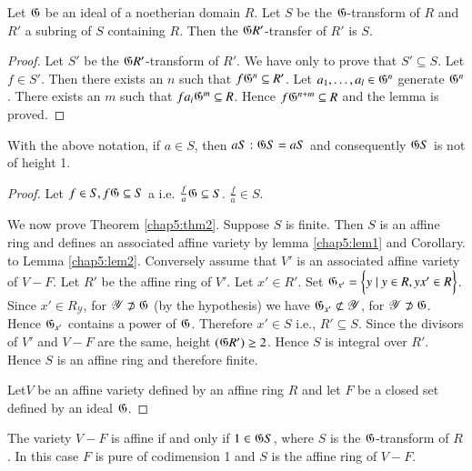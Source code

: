 \begin{lem}\label{chap5:lem2}%
  Let $\mathfrak{G}$ be an ideal of a noetherian domain $R$. Let $S$
  be the $\mathfrak{G}$-transform of $R$ and $R'$ a subring of $S$
  containing $R$. Then the $\mathfrak{G} R'$-transfer of $R'$ is $S$. 
\end{lem}

\begin{proof}
  Let $S'$ be the $\mathfrak{G} R'$-transform of $R'$. We have only to
  prove that $S' \subseteq S$. Let $f \in S'$. Then there exists an
  $n$ such that $f \mathfrak{G}^n \subseteq R'$. Let $a_1,\ldots,a_l
  \in \mathfrak{G}^n$ generate $\mathfrak{G}^n$. There exists an $m$
  such that $fa_i \mathfrak{G}^m \subseteq R$. Hence  $f \mathfrak{G}^{n+m} \subseteq R$
  and the lemma is proved.  
\end{proof}

\begin{coro*}
  With the above notation, if $a \in S$, then $aS: \mathfrak{G} S = aS$
  and consequently $\mathfrak{G} S$ is not of height 1.
 \end{coro*}
    
\begin{proof}
  Let $f \in S, f \mathfrak{G} \subseteq S$ a i.e. $\frac{f}{a}
  \mathfrak{G} \subseteq S$. $\frac{f}{a} \in S $.     

  We now prove Theorem \ref{chap5:thm2}. Suppose $S$ is finite. Then $S$ is an
  affine ring and defines an associated affine variety by lemma
  \ref{chap5:lem1} 
  and Corollary. to Lemma \ref{chap5:lem2}. Conversely assume that $V'$ is an
  associated affine variety of $V-F$. Let $R'$ be the affine ring of
  $V'$. Let $x' \in R'$. Set $\mathfrak{G}_{x'} = \bigg \{ y \mid y
  \in R, yx' \in R \bigg \}$. Since $x' \in R_\mathscr{Y}$, for
  $\mathscr{Y} \not\supset \mathfrak{G}$ (by the hypothesis) we
  have $\mathfrak{G}_{x'} \not\subset \mathscr{Y}$, for
  $\mathscr{Y} \not\supset \mathfrak{G}$. Hence $\mathfrak{G}_{x'}$ contains
  a power of $\mathfrak{G}$. Therefore $x' \in S$ i.e., $R' \subseteq S
  $. Since the divisors of $V'$ and $V-F$ are the same, height
  $(\mathfrak{G} R')\ge 2$. Hence $S$ is integral over $R'$. Hence $S$
  is an affine ring and therefore finite. 
      
  Let\pageoriginale $V$ be an affine variety defined by an affine ring
  $R$ and let $F$ be a closed set defined by an ideal $\mathfrak{G}$.   
\end{proof}   
     
\setcounter{dashthm}{2}
\begin{dashthm}\label{chap5:thm3'}%
  The variety $V-F$ is affine if and only if $1 \in \mathfrak{G} S$,   
  where $S$ is the $\mathfrak{G}$-transform of $R$. In this case $F$ is
  pure of codimension 1 and  $S$ is the affine ring of $V-F$. 
 \end{dashthm} 
     
